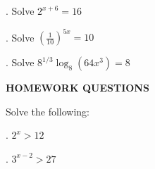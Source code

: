 \documentclass[12pt]{article}
\begin{document}
. Solve \( 2^{x+6} = 16 \)\vspace{10mm}
\vspace{10mm} %
\noindent \makebox[\linewidth]{\dotfill} %
\vspace{10mm}
\noindent \makebox[\linewidth]{\dotfill}
\vspace{10mm}
\noindent \makebox[\linewidth]{\dotfill}

. Solve \( \left(\frac{1}{10}\right)^{5x} = 10 \)\vspace{10mm}
\vspace{10mm} %
\noindent \makebox[\linewidth]{\dotfill} %
\vspace{10mm}
\noindent \makebox[\linewidth]{\dotfill}
\vspace{10mm}
\noindent \makebox[\linewidth]{\dotfill}

. Solve \( 8^{1/3}\log_{8}(64x^3) = 8 \)\vspace{10mm}
\vspace{10mm} %
\noindent \makebox[\linewidth]{\dotfill} %
\vspace{10mm}
\noindent \makebox[\linewidth]{\dotfill}
\vspace{10mm}
\noindent \makebox[\linewidth]{\dotfill}

\vfill %
\flushleft



\noindent \textbf{HOMEWORK QUESTIONS}

\noindent Solve the following:

\vspace{5mm}. \( 2^x > 12 \)\vspace{5mm}
\vspace{10mm} %
\noindent \makebox[\linewidth]{\dotfill} %
\vspace{10mm}
\noindent \makebox[\linewidth]{\dotfill}
\vspace{10mm}
\noindent \makebox[\linewidth]{\dotfill}

\vspace{5mm}. \( 3^{x-2} > 27 \)\vspace{5mm}
\vspace{10mm} %
\noindent \makebox[\linewidth]{\dotfill} %
\vspace{10mm}
\noindent \makebox[\linewidth]{\dotfill}
\vspace{10mm}
\noindent \makebox[\linewidth]{\dotfill}
\end{document}
